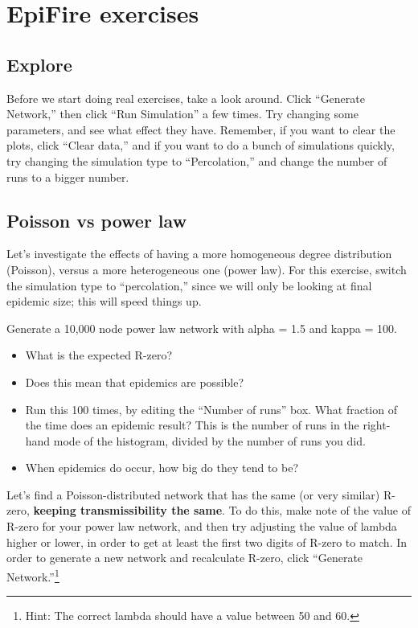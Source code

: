 \documentclass{article}
\begin{document}
\section{EpiFire exercises}

\subsection{Explore}
Before we start doing real exercises, take a look around.  Click ``Generate Network,'' then click ``Run Simulation'' a few times.  Try changing some parameters, and see what effect they have.  Remember, if you want to clear the plots, click ``Clear data,'' and if you want to do a bunch of simulations quickly, try changing the simulation type to ``Percolation,'' and change the number of runs to a bigger number.

\subsection{Poisson vs power law}
Let's investigate the effects of having a more homogeneous degree distribution (Poisson), versus a more heterogeneous one (power law).  For this exercise, switch the simulation type to ``percolation,'' since we will only be looking at final epidemic size; this will speed things up.

Generate a 10,000 node power law network with alpha = 1.5 and kappa = 100.  
\begin{itemize}
 \item What is the expected R-zero?

 \item Does this mean that epidemics are possible?

 \item Run this 100 times, by editing the ``Number of runs'' box.  What fraction of the time does an epidemic result?  This is the number of runs in the right-hand mode of the histogram, divided by the number of runs you did.

 \item When epidemics do occur, how big do they tend to be?
\end{itemize}

Let's find a Poisson-distributed network that has the same (or very similar) R-zero, \textbf{keeping transmissibility the same}.  To do this, make note of the value of R-zero for your power law network, and then try adjusting the value of lambda higher or lower, in order to get at least the first two digits of R-zero to match.  In order to generate a new network and recalculate R-zero, click ``Generate Network.''\footnote{Hint: The correct lambda should have a value between 50 and 60.}
\end{document}
